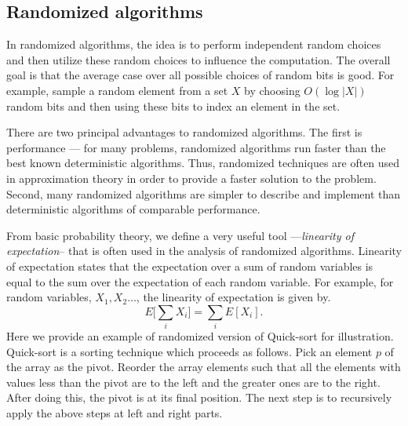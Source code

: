 \subsection{Randomized algorithms}
In randomized algorithms, the idea is to perform independent random choices and then utilize these random choices to influence the computation.
The overall goal is that the average case over all possible choices of random bits is good.
For example, sample a random element from a set $X$ by choosing $O(\log |X|)$ random bits and then using these
bits to index an element in the set. 

There are two principal advantages to randomized algorithms. The first is performance --- for many problems, 
randomized algorithms run faster than the best known deterministic algorithms.
Thus, randomized techniques are often used in approximation theory in order to provide a faster solution to the problem.
Second, many randomized algorithms are simpler to describe and implement than deterministic algorithms of
comparable performance. 

From basic probability theory, we define a very useful tool ---\textit{linearity of expectation}-- that is often used in the analysis of randomized algorithms.
Linearity of expectation states that the expectation over a sum of random variables is equal to the sum over the expectation of each random variable.
For example, for random variables, $X_1, X_2 \ldots$, the linearity of expectation is given by.
\begin{equation}
 E\big[\sum_i X_i\big] = \sum_i E[X_i].
\end{equation}
Here we provide an example of randomized version of Quick-sort for illustration. 
Quick-sort is a sorting technique which proceeds as follows.
Pick an element $p$ of the array as the pivot.
Reorder the array elements such that all the elements with values less than the pivot are to the left and the greater ones are to the right. After doing this, the pivot is at its final position.
The next step is to recursively apply the above steps at left and right parts.

